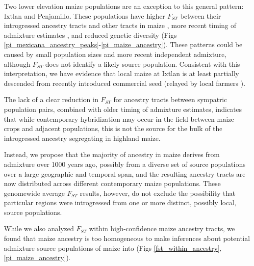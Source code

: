 Two lower elevation maize populations are an exception to this general pattern: Ixtlan and Penjamillo. These populations have higher $F_{ST}$ between their introgressed ancestry tracts and other \mexicana tracts in maize , more recent timing of admixture estimates , and reduced genetic diversity (Figs \ref{pi_mexicana_ancestry_peaks}-\ref{pi_maize_ancestry}).
These patterns could be caused by small population sizes and more recent independent admixture, although $F_{ST}$ does not identify a likely \mexicana source population.
Consistent with this interpretation, we have evidence that local maize at Ixtlan is at least partially descended from recently introduced commercial seed (relayed by local farmers \cite{Hufford:2013_crop_wild}). 

The lack of a clear reduction in $F_{ST}$ for \mexicana ancestry tracts between sympatric population pairs, combined with older timing of admixture estimates, indicates that while contemporary hybridization may occur in the field between maize crops and adjacent  \mexicana populations, this is not the source for the bulk of the introgressed ancestry segregating in highland maize. 

Instead, we propose that the majority of \mexicana ancestry in maize derives from admixture over 1000 years ago, possibly from a diverse set of \mexicana source populations over a large geographic and temporal span, and the resulting ancestry tracts are now distributed across different contemporary maize populations.
These genomewide average $F_{ST}$ results, however, do not exclude the possibility that particular regions were introgressed from one or more distinct, possibly local, source populations.

While we also analyzed $F_{ST}$ within high-confidence maize ancestry tracts, we found that maize ancestry is too homogeneous to make inferences about potential admixture source populations of maize into \mexicana (Figs \ref{fst_within_ancestry}, \ref{pi_maize_ancestry}). 

